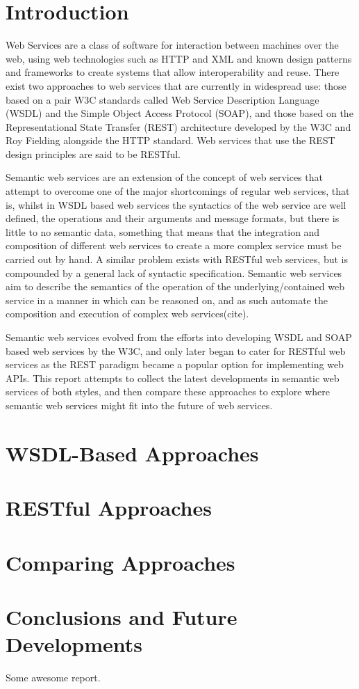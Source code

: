 \section{Introduction}

Web Services are a class of software for interaction between machines over the
web, using web technologies such as HTTP and XML and known design patterns and
frameworks to create systems that allow interoperability and reuse. There exist
two approaches to web services that are currently in widespread use: those based
on a pair W3C standards called Web Service Description Language (WSDL) and the
Simple Object Access Protocol (SOAP), and those based on the 
Representational State Transfer (REST) architecture developed by the W3C and Roy
Fielding alongside the HTTP standard. Web services that use the REST design
principles are said to be RESTful.

Semantic web services are an extension of the concept of web services that
attempt to overcome one of the major shortcomings of regular web services, that
is, whilst in WSDL based web services the syntactics of the web service are well
defined, the operations and their arguments and message formats, but there is
little to no semantic data, something that means that the integration and
composition of different web services to create a more complex service must be
carried out by hand. A similar problem exists with RESTful web services, but is
compounded by a general lack of syntactic specification. Semantic web services
aim to describe the semantics of the operation of the underlying/contained  web
service in a manner in which can be reasoned on, and as such automate the
composition and execution of complex web services(cite).

Semantic web services evolved from the efforts into developing WSDL and SOAP
based web services by the W3C, and only later began to cater for RESTful web
services as the REST paradigm became a popular option for implementing web APIs.
This report attempts to collect the latest developments in semantic web services
of both styles, and then compare these approaches to explore where semantic web
services might fit into the future of web services.

\section{WSDL-Based Approaches}



\section{RESTful Approaches}

\section{Comparing Approaches}

\section{Conclusions and Future Developments}

Some awesome report\cite{durand_deploying_2001}.
